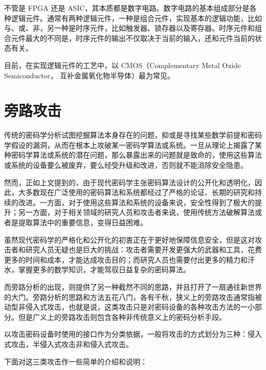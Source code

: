 不管是 FPGA 还是 ASIC，其本质都是数字电路。数字电路的基本组成部分是各种逻辑元件。通常有两种逻辑元件，一种是组合元件，实现基本的逻辑功能，比如与、或、非，另一种是时序元件，比如触发器、锁存器以及寄存器。时序元件和组合元件最大的不同是，时序元件的输出不仅取决于当前的输入，还和元件当前的状态有关。

目前，在实现逻辑元件的工艺中，以 CMOS（Complementary Metal Oxide Semiconductor， 互补金属氧化物半导体）最为常见。

\section{旁路攻击} %
传统的密码学分析试图挖掘算法本身存在的问题，抑或是寻找某些数学前提和密码学假设的漏洞，从而在根本上攻破某一密码学算法或系统。一旦从理论上揭露了某种密码学算法或系统的潜在问题，那么暴露出来的问题就是致命的，使用这些算法或系统的设备要么被废弃，要么经受升级和改进，否则就不能消除安全隐患。

然而，正如上文提到的，由于现代密码学主张密码算法设计的公开化和透明化，因此，大多数现在广泛使用的密码算法和系统都经过了严格的论证、长期的研究和持续的改进。一方面，对于使用这些算法和系统的设备来说，安全性得到了极大的提升；另一方面，对于相关领域的研究人员和攻击者来说，使用传统方法破解算法或者是提取算法中的重要信息，变得日益困难。

虽然现代密码学的严格化和公开化的初衷正在于更好地保障信息安全，但是这对攻击者和研究人员无疑也是巨大的挑战：攻击者需要开发更强大的武器和工具，花费更多的时间和成本，才能达成攻击目的；而研究人员也需要付出更多的精力和汗水，掌握更多的数学知识，才能驾驭日益复杂的密码算法。

而旁路分析的出现，则提供了另一种截然不同的思路，并且打开了一扇通往新世界的大门。旁路分析的思路和方法五花八门，各有千秋，狭义上的旁路攻击通常指被动型非侵入式攻击，也就是说，这类攻击只是对密码设备的各种攻击方法的一小部分。但是广义上的旁路攻击则包含各种非传统意义上的密码分析手段。

以攻击密码设备时使用的接口作为分类依据，一般将攻击的方式划分为三种：侵入式攻击，半侵入式攻击非和侵入式攻击。

\vspace*{0.5\baselineskip}

下面对这三类攻击作一些简单的介绍和说明： \cite{paa_cn}

